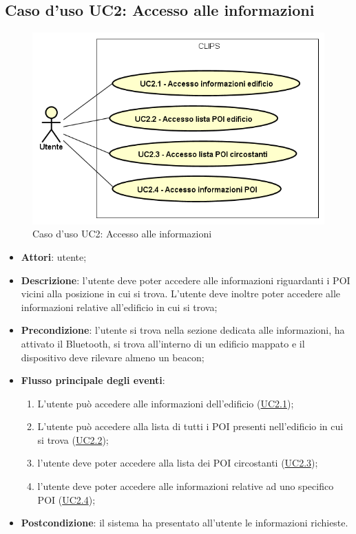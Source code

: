 \documentclass[../AnalisiDeiRequisiti.tex]{subfiles}
\begin{document}
\subsection{Caso d'uso UC2: Accesso alle informazioni}

        \begin{figure}[!h]
            \centering
            \includegraphics[scale=0.95, width=\textwidth]{img/UC2.png}
            \caption{Caso d'uso UC2: Accesso alle informazioni}\label{fig:UC2} 
        \end{figure}
\begin{itemize}
\item \textbf{Attori}: utente;
\item \textbf{Descrizione}: l'utente deve poter accedere alle informazioni riguardanti i POI vicini alla posizione in cui si trova. L'utente deve inoltre poter accedere alle informazioni relative all'edificio in cui si trova; 
      \item \textbf{Precondizione}: l'utente si trova nella sezione dedicata alle informazioni, ha attivato il Bluetooth, si trova all'interno di un edificio mappato e il dispositivo deve rilevare almeno un beacon;

        \item \textbf{Flusso principale degli eventi}:
          \begin{enumerate}
          \item L'utente può accedere alle informazioni dell'edificio (\hyperlink{UC2.1}{UC2.1});
          \item L'utente può accedere alla lista di tutti i POI presenti nell'edificio in cui si trova (\hyperlink{UC2.2}{UC2.2});
          \item l'utente deve poter accedere alla lista dei POI circostanti (\hyperlink{UC2.3}{UC2.3});
          \item l'utente deve poter accedere alle informazioni relative ad uno specifico POI (\hyperlink{UC2.4}{UC2.4});

      \end{enumerate}

    \item \textbf{Postcondizione}: il sistema ha presentato all'utente le informazioni richieste.
  \end{itemize}
\hypertarget{UC2.1}{}
\end{document}
